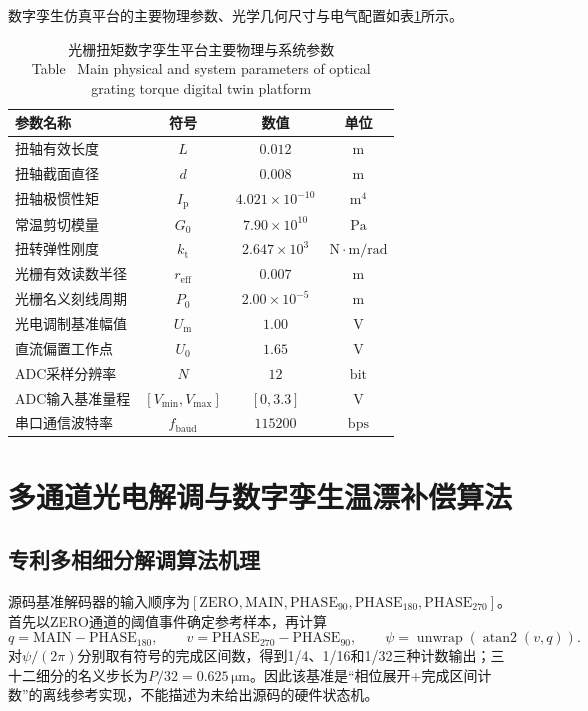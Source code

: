 \documentclass[UTF8,a4paper,12pt]{ctexart}
\newcommand{\bitablecaption}[2]{%
  \caption{#1\\[-0.2em]\small Table \thetable\ #2}
}
\begin{document}
数字孪生仿真平台的主要物理参数、光学几何尺寸与电气配置如表\ref{tab:param}所示。

\begin{table}[htbp]
  \centering
  \bitablecaption{光栅扭矩数字孪生平台主要物理与系统参数}{Main physical and system parameters of optical grating torque digital twin platform}
  \label{tab:param}
  \begin{tabular}{lccc}
    \toprule
    参数名称 & 符号 & 数值 & 单位 \\
    \midrule
    扭轴有效长度 & $L$ & $0.012$ & $\mathrm{m}$ \\
    扭轴截面直径 & $d$ & $0.008$ & $\mathrm{m}$ \\
    扭轴极惯性矩 & $I_{\mathrm{p}}$ & $4.021\times 10^{-10}$ & $\mathrm{m^4}$ \\
    常温剪切模量 & $G_0$ & $7.90\times 10^{10}$ & $\mathrm{Pa}$ \\
    扭转弹性刚度 & $k_{\mathrm{t}}$ & $2.647\times 10^{3}$ & $\mathrm{N\cdot m/rad}$ \\
    光栅有效读数半径 & $r_{\mathrm{eff}}$ & $0.007$ & $\mathrm{m}$ \\
    光栅名义刻线周期 & $P_0$ & $2.00\times 10^{-5}$ & $\mathrm{m}$ \\
    光电调制基准幅值 & $U_{\mathrm{m}}$ & $1.00$ & $\mathrm{V}$ \\
    直流偏置工作点 & $U_0$ & $1.65$ & $\mathrm{V}$ \\
    ADC采样分辨率 & $N$ & $12$ & $\mathrm{bit}$ \\
    ADC输入基准量程 & $[V_{\mathrm{min}}, V_{\mathrm{max}}]$ & $[0, 3.3]$ & $\mathrm{V}$ \\
    串口通信波特率 & $f_{\mathrm{baud}}$ & $115200$ & $\mathrm{bps}$ \\
    \bottomrule
  \end{tabular}
\end{table}

\section{多通道光电解调与数字孪生温漂补偿算法}

\subsection{专利多相细分解调算法机理}
源码基准解码器的输入顺序为$[\mathrm{ZERO},\mathrm{MAIN},\mathrm{PHASE}_{90},\mathrm{PHASE}_{180},\mathrm{PHASE}_{270}]$。首先以ZERO通道的阈值事件确定参考样本，再计算
\begin{equation}
q=\mathrm{MAIN}-\mathrm{PHASE}_{180},\qquad v=\mathrm{PHASE}_{270}-\mathrm{PHASE}_{90},\qquad \psi=\operatorname{unwrap}(\operatorname{atan2}(v,q)).
\label{eq:patent_phase}
\end{equation}
对$\psi/(2\pi)$分别取有符号的完成区间数，得到1/4、1/16和1/32三种计数输出；三十二细分的名义步长为$P/32=0.625\,\mathrm{\mu m}$。因此该基准是“相位展开+完成区间计数”的离线参考实现，不能描述为未给出源码的硬件状态机。
\end{document}

